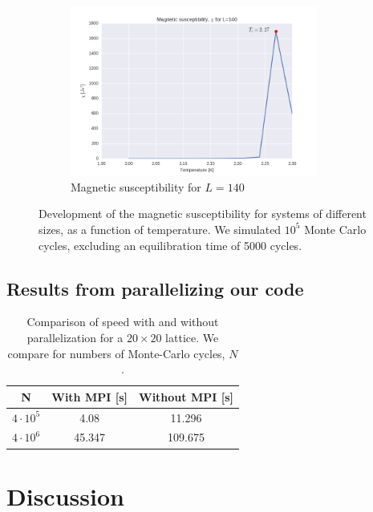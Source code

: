 \documentclass[a4paper, 10pt]{article}
\begin{document}
\begin{figure}[!ht]
\begin{subfigure}[H!]{0.5\textwidth}
        \centering
        \includegraphics[height=2.2in]{chil140.png}
        \caption{Magnetic susceptibility for $L=140$}
    \end{subfigure}
      \caption{Development of the magnetic susceptibility for systems of different sizes, as a function of temperature. We simulated $10^5$ Monte Carlo cycles, excluding an equilibration time of 5000 cycles.}\label{fig:phase_chi}
\end{figure}
\subsection{Results from parallelizing our code}
\begin{table}
\centering
\caption{Comparison of speed with and without parallelization for a $20 \times 20$ lattice. We compare for numbers of Monte-Carlo cycles, $N$.}\label{tab:compare_parallelized}
\begin{tabular}{|c|c|c|}
\hline
N & With MPI [s] &  Without MPI [s]\\
\hline
\rule{0pt}{2ex}    
$4\cdot 10^5$ & 4.08 & 11.296 \\
$4 \cdot 10^6$ & 45.347 & 109.675\\ 
\hline
\end{tabular}
\end{table}
\section{Discussion}
\end{document}
